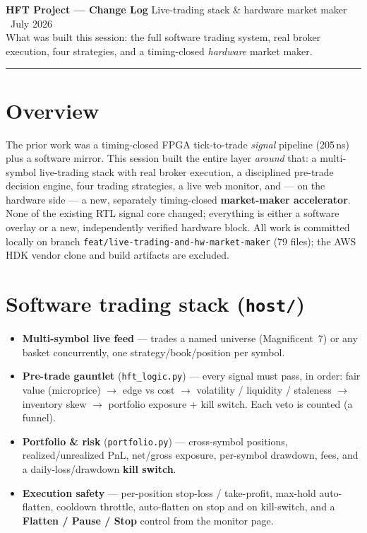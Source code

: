 \documentclass[10pt,a4paper]{article}
\newcommand{\hr}{\textcolor{rulegray}{\rule{\linewidth}{1pt}}}
\newcommand{\code}[1]{\texttt{\small #1}}
\begin{document}
{\LARGE\bfseries\color{fpgablue} HFT Project — Change Log}\hfill
{\small\color{rulegray} Live-trading stack \& hardware market maker \textbullet\ July 2026}\\[-1pt]
{\large What was built this session: the full software trading system, real broker
execution, four strategies, and a timing-closed \emph{hardware} market maker.}

\hr

\section{Overview}
The prior work was a timing-closed FPGA tick-to-trade \emph{signal} pipeline (205\,ns)
plus a software mirror. This session built the entire layer \emph{around} that: a
multi-symbol live-trading stack with real broker execution, a disciplined pre-trade
decision engine, four trading strategies, a live web monitor, and — on the hardware
side — a new, separately timing-closed \textbf{market-maker accelerator}. None of the
existing RTL signal core changed; everything is either a software overlay or a new,
independently verified hardware block. All work is committed locally on branch
\code{feat/live-trading-and-hw-market-maker} (79 files); the AWS HDK vendor clone and
build artifacts are excluded.

\section{Software trading stack (\code{host/})}
\begin{itemize}[leftmargin=1.4em, itemsep=1pt]
  \item \textbf{Multi-symbol live feed} — trades a named universe (Magnificent~7) or
  any basket concurrently, one strategy/book/position per symbol.
  \item \textbf{Pre-trade gauntlet} (\code{hft\_logic.py}) — every signal must pass, in
  order: fair value (microprice) $\to$ edge vs cost $\to$ volatility / liquidity /
  staleness $\to$ inventory skew $\to$ portfolio exposure + kill switch. Each veto is
  counted (a funnel).
  \item \textbf{Portfolio \& risk} (\code{portfolio.py}) — cross-symbol positions,
  realized/unrealized PnL, net/gross exposure, per-symbol drawdown, fees, and a
  daily-loss/drawdown \textbf{kill switch}.
  \item \textbf{Execution safety} — per-position stop-loss / take-profit, max-hold
  auto-flatten, cooldown throttle, auto-flatten on stop and on kill-switch, and a
  \textbf{Flatten / Pause / Stop} control from the monitor page.
\end{itemize}
\end{document}
